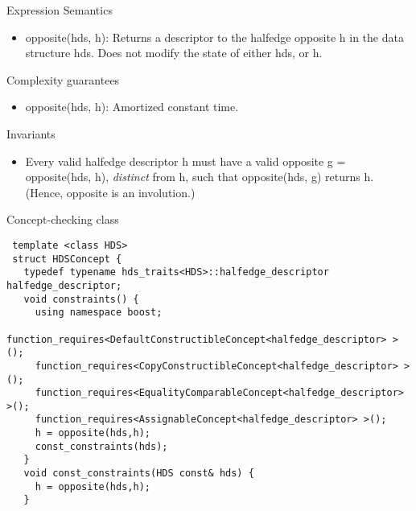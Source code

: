 \begin{Desc}
\item[Expression Semantics]\begin{itemize}
\item opposite(hds, h): Returns a descriptor to the halfedge opposite h in the data structure hds. Does not modify the state of either hds, or h.\end{itemize}
\end{Desc}
\begin{Desc}
\item[Complexity guarantees]\begin{itemize}
\item opposite(hds, h): Amortized constant time.\end{itemize}
\end{Desc}
\begin{Desc}
\item[Invariants]\begin{itemize}
\item Every valid halfedge descriptor h must have a valid opposite g = opposite(hds, h), {\em distinct\/} from h, such that opposite(hds, g) returns h. (Hence, opposite is an involution.)\end{itemize}
\end{Desc}
\begin{Desc}
\item[Concept-checking class]

\begin{Code}\begin{verbatim} template <class HDS> 
 struct HDSConcept {
   typedef typename hds_traits<HDS>::halfedge_descriptor halfedge_descriptor; 
   void constraints() {
     using namespace boost;
     function_requires<DefaultConstructibleConcept<halfedge_descriptor> >();
     function_requires<CopyConstructibleConcept<halfedge_descriptor> >();
     function_requires<EqualityComparableConcept<halfedge_descriptor> >();
     function_requires<AssignableConcept<halfedge_descriptor> >();
     h = opposite(hds,h);
     const_constraints(hds);
   }
   void const_constraints(HDS const& hds) {
     h = opposite(hds,h);
   }
\end{verbatim}\end{Code}

 \end{Desc}

